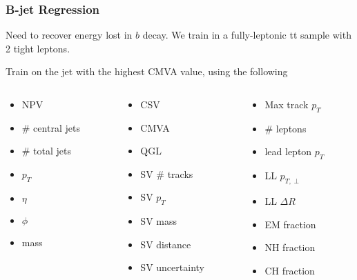 \documentclass{beamer}
\begin{document}
\begin{frame}
  \frametitle{B-jet Regression}
  Need to recover energy lost in $b$ decay. We train in a fully-leptonic tt sample
  with 2 tight leptons.

  \hspace{12pt}

  Train on the jet with the highest CMVA value, using the following

  \begin{columns}
    \begin{column}{0.33\linewidth}
      \begin{itemize}
      \item NPV
      \item \# central jets
      \item \# total jets
      \item $p_T$
      \item $\eta$
      \item $\phi$
      \item mass
      \end{itemize}
    \end{column}
    \begin{column}{0.33\linewidth}
      \begin{itemize}
      \item CSV
      \item CMVA
      \item QGL
      \item SV \# tracks
      \item SV $p_T$
      \item SV mass
      \item SV distance
      \item SV uncertainty
      \end{itemize}
    \end{column}
    \begin{column}{0.33\linewidth}
      \begin{itemize}
      \item Max track $p_T$
      \item \# leptons
      \item lead lepton $p_T$
      \item LL $p_{T, \perp}$
      \item LL $\Delta R$
      \item EM fraction
      \item NH fraction
      \item CH fraction
      \end{itemize}
    \end{column}
  \end{columns}
\end{frame}
\end{document}
